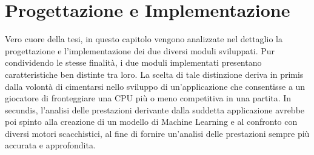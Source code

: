 \chapter{Progettazione e Implementazione}
\label{cap: design}
%

\begin{citazione}
Vero cuore della tesi, in questo capitolo vengono analizzate nel dettaglio la progettazione e l'implementazione dei due diversi moduli sviluppati. Pur condividendo le stesse finalità, i due moduli implementati presentano caratteristiche ben distinte tra loro. La scelta di tale distinzione deriva in primis dalla volontà di cimentarsi nello sviluppo di un'applicazione che consentisse a un giocatore di fronteggiare una CPU più o meno competitiva in una partita. In secundis, l'analisi delle prestazioni derivante dalla suddetta applicazione avrebbe poi spinto alla creazione di un modello di Machine Learning e al confronto con diversi motori scacchistici, al fine di fornire un'analisi delle prestazioni sempre più accurata e approfondita.
\end{citazione}

